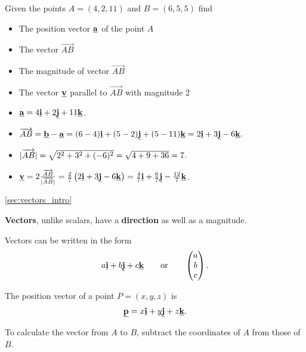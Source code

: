 \begin{example}[Lecture]
Given the points $A=(4,2,11)$ and $B=(6,5,5)$ find
\begin{itemize}
\item The position vector $\underline{\mathbf{a}}$ of the point $A$
\item The vector $\overrightarrow{AB}$
\item The magnitude of vector $\overrightarrow{AB}$
\item The vector $\underline{\mathbf{v}}$ parallel to $\overrightarrow{AB}$ with magnitude 2
\end{itemize}
\end{example}
\begin{solution}
\begin{itemize}
    \item $\underline{\mathbf{a}}=4\underline{\mathbf{i}}+2\underline{\mathbf{j}}+11\underline{\mathbf{k}}$.
    \item $\overrightarrow{AB} = \underline{\mathbf{b}}-\underline{\mathbf{a}}
        = (6-4)\underline{\mathbf{i}}+(5-2)\underline{\mathbf{j}}+(5-11)\underline{\mathbf{k}}
        =2\underline{\mathbf{i}}+3\underline{\mathbf{j}}-6\underline{\mathbf{k}}.$
    \item $\lvert\overrightarrow{AB}\rvert =\sqrt{2^2+3^2+(-6)^2} =\sqrt{4+9+36}=7$.
    \item $\underline{\mathbf{v}}= 2\frac{\overrightarrow{AB}}{\lvert\overrightarrow{AB}\rvert}
    = \frac{2}{7}\left(2\underline{\mathbf{i}}+3\underline{\mathbf{j}}-6\underline{\mathbf{k}}\right)
    = \frac{4}{7}\underline{\mathbf{i}}+\frac{6}{7}\underline{\mathbf{j}}-\frac{12}{7}\underline{\mathbf{k}}$.
\end{itemize}

\end{solution}

\begin{recap}{\ref{sec:vectors_intro}}
\item \textbf{Vectors}, unlike scalars, have a \textbf{direction} as well as a magnitude.
\item Vectors can be written in the form
\[
a\underline{\mathbf{i}}+b\underline{\mathbf{j}}+c\underline{\mathbf{k}}
\qquad\text{or}\qquad
\begin{pmatrix}a\\b\\c\end{pmatrix}.
\]
\item The position vector of a point $P=(x,y,z)$ is
\[
\underline{\mathbf{p}}=x\underline{\mathbf{i}}+y\underline{\mathbf{j}}+z\underline{\mathbf{k}}.
\]
\item To calculate the vector from $A$ to $B$, subtract the coordinates of $A$ from those of $B$.
\end{recap}

